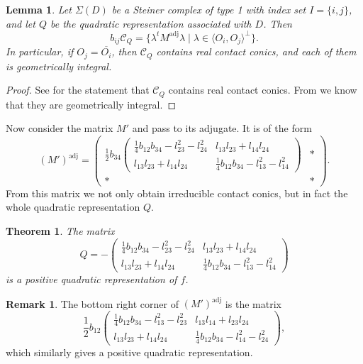 \documentclass[a4paper,10pt]{amsart}
\theoremstyle{definition}
\newtheorem{rem}[Def]{Remark}
\theoremstyle{plain}
\newtheorem{thm}[Def]{Theorem}
\newtheorem{lem}[Def]{Lemma}
\newcommand{\adj}{\operatorname{adj}} %
\newcommand{\cC}{{\mathcal C}}
\begin{document}
\begin{lem}
    Let $\Sigma(D)$ be a Steiner complex of type 1 with index set $I = \{i,j\}$, and let $Q$ be the quadratic representation associated with $D$. Then
    \begin{equation*}
        b_{ij}\cC_Q = \{ \lambda^t M^{\adj}\lambda \mid \lambda \in \langle O_i, O_j \rangle^\perp \}.
    \end{equation*}
    In particular, if $O_j = \overline{O_i}$, then $\cC_Q$ contains real contact conics, and each of them is geometrically integral.
\end{lem}

\begin{proof}
    See \cite[Lemma 6.7]{plaumann} for the statement that $\cC_Q$ contains real contact conics. From  we know that they are geometrically integral.
\end{proof}

Now consider the matrix $M'$ and pass to its adjugate. It is of the form
\begin{equation*}
    (M')^{\adj} = \left(\begin{array}{cc}
        \frac{1}{2}b_{34} \begin{pmatrix}
         \frac{1}{4} b_{12}b_{34} - l_{23}^2 - l_{24}^2 & l_{13}l_{23} + l_{14}l_{24} \\
         l_{13}l_{23} + l_{14}l_{24} & \frac{1}{4} b_{12}b_{34} - l_{13}^2 - l_{14}^2
        \end{pmatrix} & * \\
        * & *
    \end{array}\right).
\end{equation*}
From this matrix we not only obtain irreducible contact conics, but in fact the whole quadratic representation $Q$.

\begin{thm}
    The matrix
    \begin{equation*}
        Q = - \begin{pmatrix}
         \frac{1}{4} b_{12}b_{34} - l_{23}^2 - l_{24}^2 & l_{13}l_{23} + l_{14}l_{24} \\
         l_{13}l_{23} + l_{14}l_{24} & \frac{1}{4} b_{12}b_{34} - l_{13}^2 - l_{14}^2
        \end{pmatrix}
    \end{equation*}
    is a positive quadratic representation of $f$.
\end{thm}

\begin{rem}
    The bottom right corner of $(M')^{\adj}$ is the matrix
    \begin{equation*}
        \frac{1}{2}b_{12} \begin{pmatrix}
         \frac{1}{4} b_{12}b_{34} - l_{13}^2 - l_{23}^2 & l_{13}l_{14} + l_{23}l_{24} \\
         l_{13}l_{23} + l_{14}l_{24} & \frac{1}{4} b_{12}b_{34} - l_{14}^2 - l_{24}^2
        \end{pmatrix},
    \end{equation*}
    which similarly gives a positive quadratic representation.
\end{rem}
\end{document}
